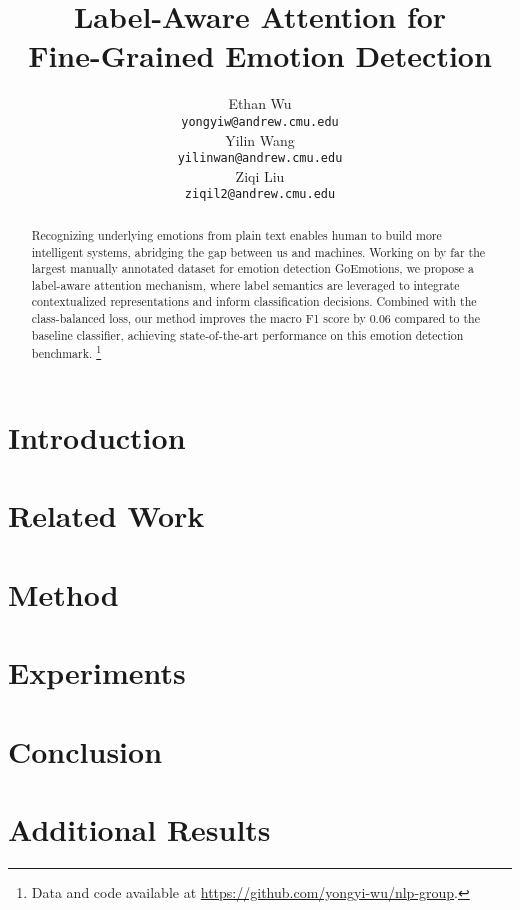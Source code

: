 \documentclass{article}
\title{Label-Aware Attention for \\ Fine-Grained Emotion Detection}
\author{%
  Ethan Wu \\
  \texttt{yongyiw@andrew.cmu.edu} \\
   \And
   Yilin Wang \\
   \texttt{yilinwan@andrew.cmu.edu} \\
   \And
   Ziqi Liu \\
   \texttt{ziqil2@andrew.cmu.edu} \\
}
\begin{document}
\maketitle

\begin{abstract}
    Recognizing underlying emotions from plain text enables human to build more intelligent systems, abridging the gap between us and machines. Working on by far the largest manually annotated dataset for emotion detection GoEmotions, we propose a label-aware attention mechanism, where label semantics are leveraged to integrate contextualized representations and inform classification decisions. Combined with the class-balanced loss, our method improves the macro F1 score by 0.06 compared to the baseline classifier, achieving state-of-the-art performance on this emotion detection benchmark. \footnote{Data and code available at \href{https://github.com/yongyi-wu/nlp-group}{https://github.com/yongyi-wu/nlp-group}.}
\end{abstract}

\section{Introduction}\label{intro}


\section{Related Work}\label{rel}


\section{Method}\label{method} %


\section{Experiments}\label{exp}


% 

%

% 

\section{Conclusion}\label{conc}






\newpage 
\appendix
\section{Additional Results}\label{app}

\end{document}
